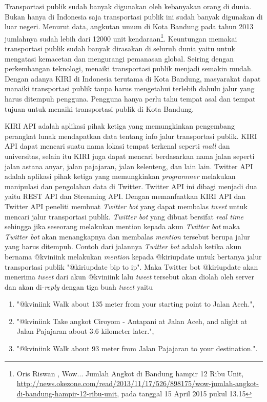 Transportasi publik sudah banyak digunakan oleh kebanyakan orang di dunia. Bukan hanya di Indonesia saja transportasi publik ini sudah banyak digunakan di luar negeri. Menurut data, angkutan umum di Kota Bandung pada tahun 2013 jumlahnya sudah lebih dari 12000 unit kendaraan\footnote{Oris Riswan , Wow... Jumlah Angkot di Bandung hampir 12 Ribu Unit, \url{http://news.okezone.com/read/2013/11/17/526/898175/wow-jumlah-angkot-di-bandung-hampir-12-ribu-unit}, pada tanggal 15 April 2015 pukul 13.15}. Keuntungan memakai transportasi publik sudah banyak dirasakan di seluruh dunia yaitu untuk mengatasi kemacetan dan mengurangi pemanasan global. Seiring dengan perkembangan teknologi, menaiki transportasi publik menjadi semakin mudah. Dengan adanya KIRI di Indonesia terutama di Kota Bandung, masyarakat dapat manaiki  transportasi publik tanpa harus mengetahui terlebih dahulu jalur yang harus ditempuh pengguna. Pengguna hanya perlu tahu tempat asal dan tempat tujuan untuk menaiki transportasi publik di Kota Bandung.

KIRI API adalah aplikasi pihak ketiga yang memungkinkan pengembang perangkat lunak mendapatkan data tentang info jalur transportasi publik. KIRI API dapat mencari suatu nama lokasi tempat terkenal seperti \textit{mall} dan universitas, selain itu KIRI juga dapat mencari berdasarkan nama jalan seperti jalan astana anyar, jalan pajajaran, jalan kelenteng, dan lain lain. Twitter API adalah aplikasi pihak ketiga yang memungkinkan \textit{programmer} melakukan manipulasi dan pengolahan data di Twitter. Twitter API ini dibagi menjadi dua yaitu REST API dan Streaming API. Dengan memanfaatkan KIRI API dan Twitter API peneliti membuat \textit{Twitter bot} yang dapat membalas \textit{tweet} untuk mencari jalur transportasi publik. \textit{Twitter bot} yang dibuat bersifat \textit{real time} sehingga jika seseorang melakukan mention kepada akun \textit{Twitter bot} maka \textit{Twitter bot} akan menangkapnya dan membalas \textit{mention} tersebut berupa jalur yang harus ditempuh. Contoh dari jalannya \textit{Twitter bot} adalah ketika akun bernama @kviniink melakukan \textit{mention} kepada @kiriupdate untuk bertanya jalur transportasi publik "@kiriupdate bip to ip". Maka Twitter bot @kiriupdate akan menerima \textit{tweet} dari akun @kviniink lalu \textit{tweet} tersebut akan diolah oleh server dan akan di-\textit{reply} dengan tiga buah \textit{tweet}  yaitu 
\begin{enumerate}
	\item "@kviniink Walk about 135 meter from your starting point to Jalan Aceh.",
	\item "@kviniink Take angkot Ciroyom - Antapani at Jalan Aceh, and alight at Jalan Pajajaran about 3.6 kilometer later.",
	\item "@kviniink Walk about 93 meter from Jalan Pajajaran to your destination.".
\end{enumerate}

